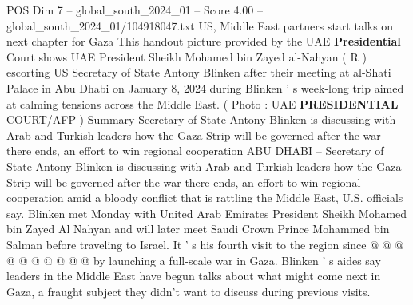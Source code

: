 \begin{textsample}{POS Dim 7 – global\_south\_2024\_01 – Score 4.00 – global\_south\_2024\_01/104918047.txt}  \label{ex:f7_pos_314}
US, Middle East partners start talks on next chapter for Gaza This handout picture provided by the UAE \textbf{Presidential} Court shows UAE President Sheikh Mohamed bin Zayed al-Nahyan ( R ) escorting US Secretary of State Antony Blinken after their meeting at al-Shati Palace in Abu Dhabi on January 8, 2024 during Blinken ' s week-long trip aimed at calming tensions across the Middle East. ( Photo : UAE \textbf{PRESIDENTIAL} COURT/AFP ) Summary Secretary of State Antony Blinken is discussing with Arab and Turkish leaders how the Gaza Strip will be governed after the war there ends, an effort to win regional cooperation ABU DHABI -- Secretary of State Antony Blinken is discussing with Arab and Turkish leaders how the Gaza Strip will be governed after the war there ends, an effort to win regional cooperation amid a bloody conflict that is rattling the Middle East, U.S. officials say.
Blinken met Monday with United Arab Emirates President Sheikh Mohamed bin Zayed Al Nahyan and will later meet Saudi Crown Prince Mohammed bin Salman before traveling to Israel.
It ' s his fourth visit to the region since @ @ @ @ @ @ @ @ @ @ by launching a full-scale war in Gaza.
Blinken ' s aides say leaders in the Middle East have begun talks about what might come next in Gaza, a fraught subject they didn't want to discuss during previous visits.

\end{textsample}
